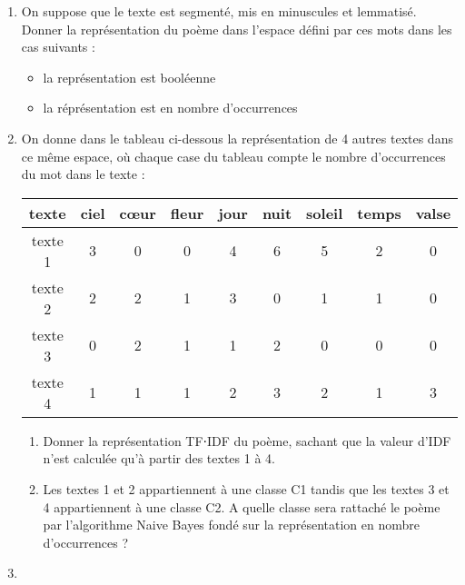 \documentclass[a4paper, 11pt]{article}
\begin{document}
\begin{enumerate}
    \item On suppose que le texte est segmenté, mis en minuscules et lemmatisé. Donner la
        représentation du poème dans l'espace défini par ces mots dans les cas suivants :
        \begin{itemize}
            \item la représentation est booléenne
            \item la réprésentation est en nombre d'occurrences
        \end{itemize}
    \item On donne dans le tableau ci-dessous la représentation de 4 autres textes dans ce même
        espace, où chaque case du tableau compte le nombre d'occurrences du mot dans le texte :

        \begin{center}
        \begin{tabu}{|c|c|c|c|c|c|c|c|c|}
            \hline
            \textbf{texte} & ciel & cœur & fleur & jour & nuit & soleil & temps & valse\\
            \hline
            texte 1 & 3 & 0 & 0 & 4 & 6 & 5 & 2 & 0\\
            texte 2 & 2 & 2 & 1 & 3 & 0 & 1 & 1 & 0 \\
            texte 3 &  0 & 2 & 1 & 1 & 2 & 0 & 0 & 0\\
            texte 4 & 1 & 1 & 1 & 2 & 3 & 2 & 1 & 3 \\
            \hline
        \end{tabu}
        \end{center}

        \begin{enumerate}
            \item Donner la représentation TF⋅IDF du poème, sachant que la valeur d'IDF n'est calculée qu'à partir des textes 1 à 4.
            \item Les textes 1 et 2 appartiennent à une classe C1 tandis que les textes 3 et 4 appartiennent à une classe C2. A quelle classe sera rattaché le poème par l'algorithme Naive Bayes fondé sur la représentation en nombre d'occurrences ?
        \end{enumerate}
    \item
\end{enumerate}
\end{document}

